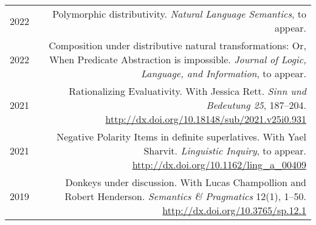 \documentclass[12pt]{article}
\renewcommand{\arraystretch}{1.25} %
\newcommand{\doi}[1]{\url{http://dx.doi.org/#1}}
\newcommand{\refmark}{\textcolor{gray}{\textdagger}}
\begin{document}
\begingroup
\renewcommand{\arraystretch}{1.5} %
\begin{longtable}{LR}
  2022  & Polymorphic distributivity.\newline
          \textit{Natural Language Semantics}, to appear.\\
  2022  & Composition under distributive natural transformations: Or, When
          Predicate Abstraction is impossible.\newline
          \textit{Journal of Logic, Language, and Information}, to appear.\\
  2021  & Rationalizing Evaluativity.\newline
          With Jessica Rett.\newline
          \textit{Sinn und Bedeutung 25}, 187--204.\newline
          \doi{10.18148/sub/2021.v25i0.931}\\
  2021  & Negative Polarity Items in definite superlatives.\newline
          With Yael Sharvit.\newline
          \textit{Linguistic Inquiry}, to appear.\newline
          \doi{10.1162/ling_a_00409}\\
  2019  & Donkeys under discussion.\newline
          With Lucas Champollion and Robert Henderson.\newline
          \textit{Semantics \& Pragmatics} 12(1), 1--50.\newline
          \doi{10.3765/sp.12.1}\\

\end{longtable}
\end{document}
